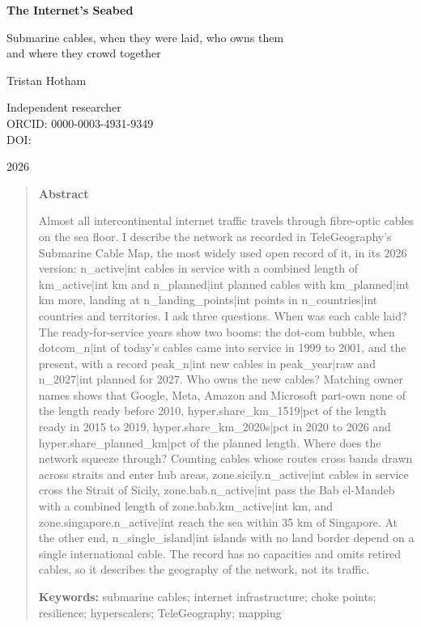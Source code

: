 \documentclass[11pt,a4paper]{article}
\begin{document}
\begin{center}
{\Large\bfseries The Internet's Seabed\par}
\vspace{0.4em}
{\large Submarine cables, when they were laid, who owns them\\and where they crowd together\par}
\vspace{1.2em}
{\large Tristan Hotham\par}
\vspace{0.3em}
{\small Independent researcher\\
ORCID: 0000-0003-4931-9349\\
DOI: \par}
\vspace{0.8em}
2026
\end{center}

\begin{quote}
\small
\begin{center}\textbf{Abstract}\end{center}
Almost all intercontinental internet traffic travels through fibre-optic cables on the sea floor. I describe the network as recorded in TeleGeography's Submarine Cable Map, the most widely used open record of it, in its 2026 version: {{n_active|int}} cables in service with a combined length of {{km_active|int}} km and {{n_planned|int}} planned cables with {{km_planned|int}} km more, landing at {{n_landing_points|int}} points in {{n_countries|int}} countries and territories. I ask three questions. When was each cable laid? The ready-for-service years show two booms: the dot-com bubble, when {{dotcom_n|int}} of today's cables came into service in 1999 to 2001, and the present, with a record {{peak_n|int}} new cables in {{peak_year|raw}} and {{n_2027|int}} planned for 2027. Who owns the new cables? Matching owner names shows that Google, Meta, Amazon and Microsoft part-own none of the length ready before 2010, {{hyper.share_km_1519|pct}} of the length ready in 2015 to 2019, {{hyper.share_km_2020s|pct}} in 2020 to 2026 and {{hyper.share_planned_km|pct}} of the planned length. Where does the network squeeze through? Counting cables whose routes cross bands drawn across straits and enter hub areas, {{zone.sicily.n_active|int}} cables in service cross the Strait of Sicily, {{zone.bab.n_active|int}} pass the Bab el-Mandeb with a combined length of {{zone.bab.km_active|int}} km, and {{zone.singapore.n_active|int}} reach the sea within 35 km of Singapore. At the other end, {{n_single_island|int}} islands with no land border depend on a single international cable. The record has no capacities and omits retired cables, so it describes the geography of the network, not its traffic.

\textbf{Keywords:} submarine cables; internet infrastructure; choke points; resilience; hyperscalers; TeleGeography; mapping
\end{quote}
\end{document}
